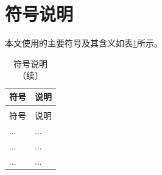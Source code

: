 
\section{符号说明}

本文使用的主要符号及其含义如表\ref{tab:符号说明}所示。

{\setlength{\tabcolsep}{3pt}
\begin{longtable}{>{\centering\arraybackslash}p{}>{\centering\arraybackslash}p{}}
  \caption{符号说明}
  \label{tab:符号说明} \\
  \toprule
  符号 & 说明 \\
  \midrule
  \endfirsthead
  \caption{符号说明（续）} \\
  \toprule
  符号 & 说明 \\
  \midrule
  \endhead
  \bottomrule
  \endfoot
  ... & ... \\
  ... & ... \\
  ... & ...
\end{longtable}}
